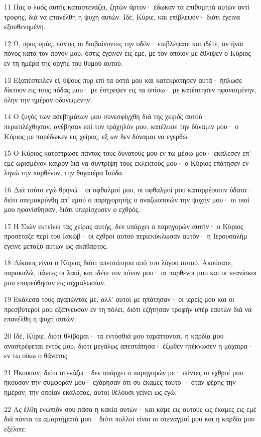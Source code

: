 \par 11 Πας ο λαός αυτής καταστενάζει, ζητών άρτον· έδωκαν τα επιθυμητά αυτών αντί τροφής, διά να επανέλθη η ψυχή αυτών. Ιδέ, Κύριε, και επίβλεψον· διότι έγεινα εξουθενημένη.
\par 12 Ω, προς υμάς, πάντες οι διαβαίνοντες την οδόν· επιβλέψατε και ιδέτε, αν ήναι πόνος κατά τον πόνον μου, όστις έγεινεν εις εμέ, με τον οποίον με έθλιψεν ο Κύριος εν τη ημέρα της οργής του θυμού αυτού.
\par 13 Εξαπέστειλεν εξ ύψους πυρ επί τα οστά μου και κατεκράτησεν αυτά· ήπλωσε δίκτυον εις τους πόδας μου· με έστρεψεν εις τα οπίσω· με κατέστησεν ηφανισμένην, όλην την ημέραν οδυνωμένην.
\par 14 Ο ζυγός των ασεβημάτων μου συνεσφίγχθη διά της χειρός αυτού· περιεπλέχθησαν, ανέβησαν επί τον τράχηλόν μου, κατέλυσε την δύναμίν μου· ο Κύριος με παρέδωκεν εις χείρας, εξ ων δεν δύναμαι να εγερθώ.
\par 15 Ο Κύριος κατέστρωσε πάντας τους δυνατούς μου εν τω μέσω μου· εκάλεσεν επ' εμέ ωρισμένον καιρόν διά να συντρίψη τους εκλεκτούς μου· ο Κύριος επάτησεν εν ληνώ την παρθένον, την θυγατέρα Ιούδα.
\par 16 Διά ταύτα εγώ θρηνώ· οι οφθαλμοί μου, οι οφθαλμοί μου καταρρέουσιν ύδατα· διότι απεμακρύνθη απ' εμού ο παρηγορητής ο αναζωοποιών την ψυχήν μου· οι υιοί μου ηφανίσθησαν, διότι υπερίσχυσεν ο εχθρός.
\par 17 Η Σιών εκτείνει τας χείρας αυτής, δεν υπάρχει ο παρηγορών αυτήν· ο Κύριος προσέταξε περί του Ιακώβ· οι εχθροί αυτού περιεκύκλωσαν αυτόν· η Ιερουσαλήμ έγεινε μεταξύ αυτών ως ακάθαρτος.
\par 18 Δίκαιος είναι ο Κύριος διότι απεστάτησα από του λόγου αυτού. Ακούσατε, παρακαλώ, πάντες οι λαοί, και ιδέτε τον πόνον μου· αι παρθένοι μου και οι νεανίσκοι μου επορεύθησαν εις αιχμαλωσίαν.
\par 19 Εκάλεσα τους αγαπώντάς με, αλλ' αυτοί με ηπάτησαν· οι ιερείς μου και οι πρεσβύτεροί μου εξέπνευσαν εν τη πόλει, διότι εζήτησαν τροφήν υπέρ εαυτών διά να επανέλθη η ψυχή αυτών.
\par 20 Ιδέ, Κύριε, διότι θλίβομαι· τα εντόσθιά μου ταράττονται, η καρδία μου αναστρέφεται εντός μου, διότι μεγάλως απεστάτησα· έξωθεν ητέκνωσεν η μάχαιρα· εν τω οίκω ο θάνατος.
\par 21 Ήκουσαν, διότι στενάζω· δεν υπάρχει ο παρηγορών με· πάντες οι εχθροί μου ήκουσαν την συμφοράν μου· εχάρησαν ότι συ έκαμες τούτο · όταν φέρης την ημέραν, την οποίαν εκάλεσας, αυτοί θέλουσι γείνει ως εγώ.
\par 22 Ας έλθη ενώπιόν σου πάσα η κακία αυτών· και κάμε εις αυτούς ως έκαμες εις εμέ διά πάντα τα αμαρτήματά μου· διότι πολλοί είναι οι στεναγμοί μου και η καρδία μου εξέλιπε.

